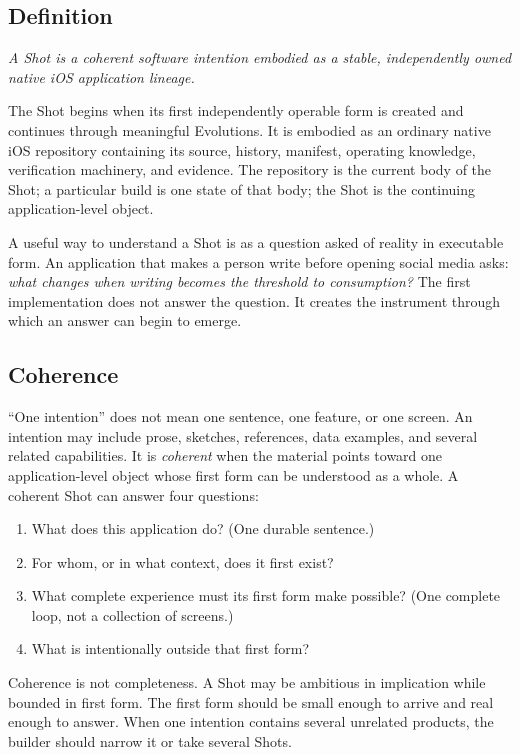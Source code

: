 \documentclass[11pt]{article}
\newenvironment{creed}
  {\begin{center}\begin{minipage}{0.86\textwidth}\itshape\large\centering}
  {\end{minipage}\end{center}\vspace{0.4em}}
\begin{document}
\subsection{Definition}

\begin{creed}
A Shot is a coherent software intention embodied as a stable,
independently owned native iOS application lineage.
\end{creed}

The Shot begins when its first independently operable form is created
and continues through meaningful Evolutions. It is embodied as an
ordinary native iOS repository containing its source, history, manifest,
operating knowledge, verification machinery, and evidence. The
repository is the current body of the Shot; a particular build is one
state of that body; the Shot is the continuing application-level object.

A useful way to understand a Shot is as a question asked of reality in
executable form. An application that makes a person write before opening
social media asks: \emph{what changes when writing becomes the threshold
to consumption?} The first implementation does not answer the question.
It creates the instrument through which an answer can begin to emerge.

\subsection{Coherence}

``One intention'' does not mean one sentence, one feature, or one
screen. An intention may include prose, sketches, references, data
examples, and several related capabilities. It is \emph{coherent} when
the material points toward one application-level object whose first form
can be understood as a whole. A coherent Shot can answer four questions:

\begin{enumerate}
\item What does this application do? (One durable sentence.)
\item For whom, or in what context, does it first exist?
\item What complete experience must its first form make possible?
      (One complete loop, not a collection of screens.)
\item What is intentionally outside that first form?
\end{enumerate}

Coherence is not completeness. A Shot may be ambitious in implication
while bounded in first form. The first form should be small enough to
arrive and real enough to answer. When one intention contains several
unrelated products, the builder should narrow it or take several Shots.
\end{document}
